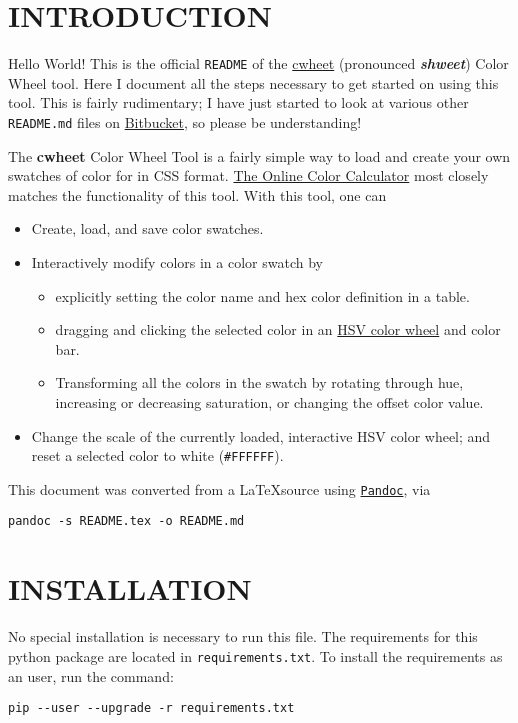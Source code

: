 \documentclass[]{article}
\author{Tanim Islam}
\date{\today}
\begin{document}
\section{INTRODUCTION}\label{introduction}

Hello World! This is the official \texttt{README} of the
\href{https://bitbucket.org/tanim_islam/cwheet}{cwheet} (pronounced
\textit{\textbf{shweet}}) Color Wheel tool. Here I document all the
steps necessary to get started on using this tool. This is fairly
rudimentary; I have just started to look at various other
\texttt{README.md} files on \href{https://bitbucket.org}{Bitbucket},
so please be understanding!

The \textbf{cwheet} Color Wheel Tool is a fairly simple way to load
and create your own swatches of color for in CSS
format. \href{http://www.sessions.edu/color-calculator}{The Online
 Color Calculator} most closely matches the functionality of this
tool. With this tool, one can
\begin{itemize}
  \item Create, load, and save color swatches.
  \item Interactively modify colors in a color swatch by
    \begin{itemize}
      \item explicitly setting the color name and hex color definition
        in a table.
      \item dragging and clicking the selected color in an
        \href{https://en.wikipedia.org/wiki/HSL_and_HSV}{HSV color
          wheel} and color bar.        
        \item Transforming all the colors in the swatch by rotating
          through hue, increasing or decreasing saturation, or
          changing the offset color value.
    \end{itemize}
  \item Change the scale of the currently loaded, interactive HSV
    color wheel; and reset a selected color to white
    (\texttt{\#FFFFFF}). 
\end{itemize}

This document was converted from a \LaTeX source using
\href{http://pandoc.org/index.html}{\texttt{Pandoc}}, via
\begin{verbatim}
pandoc -s README.tex -o README.md
\end{verbatim}

\section{INSTALLATION}
No special installation is necessary to run this file. The
requirements for this python package are located in
\texttt{requirements.txt}. To install the requirements as an user, run
the command:
\begin{verbatim}
pip --user --upgrade -r requirements.txt
\end{verbatim}
\end{document}

